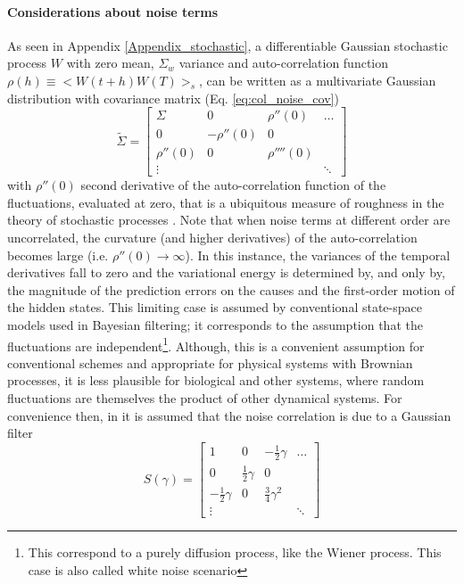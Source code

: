 \documentclass[10pt]{article}
\begin{document}
\paragraph{Considerations about noise terms}
As seen in Appendix \ref{Appendix_stochastic}, a differentiable Gaussian stochastic process $W$ with zero mean, $\Sigma_w$ variance and auto-correlation function $\rho (h) \equiv <W(t+h)W(T)>_s$, can be written as a multivariate Gaussian distribution with covariance matrix (Eq. \ref{eq:col_noise_cov})
\begin{equation}
    \tilde{\Sigma} = 
    \begin{bmatrix}
    \Sigma & 0 & \rho''(0) & \dots \\
    0 & -\rho''(0) & 0 & \\
    \rho''(0) & 0 & \rho''''(0) \\
    \vdots & & & \ddots
    \end{bmatrix}
\end{equation}
with $\rho''(0)$ second derivative of the auto-correlation function of the fluctuations, evaluated at zero, that is a ubiquitous measure of roughness in the theory of stochastic processes \citep{Cox1977}. 
Note that when noise terms at different order are uncorrelated, the curvature (and higher derivatives) of the auto-correlation becomes large (i.e. $\rho''(0) \rightarrow \infty$). In this instance, the variances of the temporal derivatives fall to zero and the variational energy is determined by, and only by, the magnitude of the prediction errors on the causes and the first-order motion of the hidden states. This limiting case is assumed by conventional state-space models used in Bayesian filtering; it corresponds to the assumption that the fluctuations are independent\footnote{This correspond to a purely diffusion process, like the Wiener process. This case is also called white noise scenario}. Although, this is a convenient assumption for conventional schemes and appropriate for physical systems with Brownian processes, it is less plausible for biological and other systems, where random fluctuations are themselves the product of other dynamical systems.
For convenience then, in \citep{Friston2008a} it is assumed that the noise correlation is due to a Gaussian filter 
\begin{equation}
    S(\gamma) = 
    \begin{bmatrix}
    1 & 0 & - \frac{1}{2} \gamma & \dots \\
    0 & \frac{1}{2} \gamma & 0 & \\
    - \frac{1}{2} \gamma & 0 & \frac{3}{4} \gamma^2 \\
    \vdots & & & \ddots
    \end{bmatrix}
\end{equation}
\end{document}
